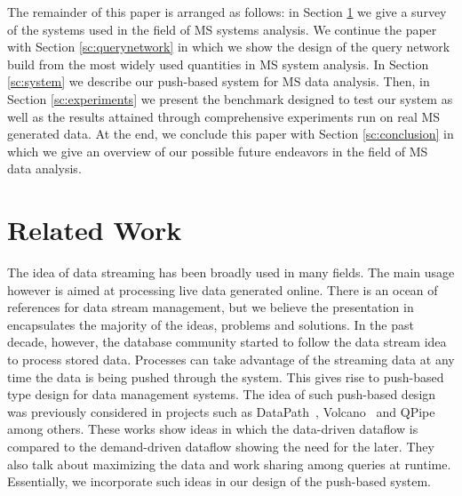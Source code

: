 \documentclass[10pt,journal,final,letterpaper,twocolumn]{IEEEtran}
\begin{document}
The remainder of this paper is arranged as follows: in Section
\ref{sc:relatedwork} we give a survey of the systems used in the
field of MS systems analysis. We continue the paper with Section
\ref{sc:querynetwork} in which we show the design of the query
network build from the most widely used quantities in MS system
analysis. In Section \ref{sc:system} we describe our push-based
system for MS data analysis. Then, in Section \ref{sc:experiments}
we present the benchmark designed to test our system as well as the
results attained through comprehensive experiments run on real MS
generated data. At the end, we conclude this paper with Section
\ref{sc:conclusion} in which we give an overview of our possible
future endeavors in the field of MS data analysis.




\section{Related Work}\label{sc:relatedwork}
The idea of data streaming has been broadly used in many fields. The
main usage however is aimed at processing live data generated
online. There is an ocean of references for data stream management,
but we believe the presentation in~\cite{DataStreamManagement}
encapsulates the majority of the ideas, problems and solutions. In
the past decade, however, the database community started to follow
the data stream idea to process stored data. Processes can take
advantage of the streaming data at any time the data is being pushed
through the system. This gives rise to push-based type design for
data management systems. The idea of such push-based design was
previously considered in projects such as DataPath~\cite{DataPath},
Volcano~\cite{Volcano} and QPipe~\cite{Qpipe} among others. These
works show ideas in which the data-driven dataflow is compared to
the demand-driven dataflow showing the need for the later. They also
talk about maximizing the data and work sharing among queries at
runtime. Essentially, we incorporate such ideas in our design of the
push-based system.
\end{document}
